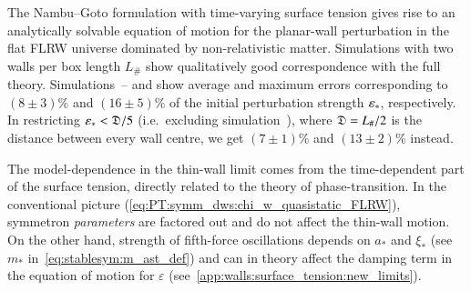 

\newcommand{\wallsep}{\ALIASwallsep}
\newcommand\hpA{\ALIAShpA}
\newcommand\hpB{\ALIAShpB}
\newcommand\hpC{\ALIAShpC}
\newcommand\hpAB{\ALIAShpAB}
\newcommand\hpCR{\ALIAShpCR}
\newcommand\hpCI{\ALIAShpCI}
\newcommand\epsA{\ALIASepsA}
\newcommand\epsB{\ALIASepsB}
\newcommand\epsC{\ALIASepsC}






    The Nambu--Goto formulation with time-varying surface tension gives rise to an analytically solvable equation of motion for the planar-wall perturbation in the flat FLRW universe dominated by non-relativistic matter. Simulations with two walls per box length $L_\#$ show qualitatively good correspondence with the full theory. Simulations~-- and  show average and maximum errors corresponding to $(8\pm 3)\%$ and $(16\pm 5)\%$ of the initial perturbation strength $\varepsilon_\ast$, respectively. In restricting $\epsast <\wallsep/5$ (i.e.~excluding simulation~), where $\wallsep=L_\#/2$ is the distance between every wall centre, we get $(7\pm 1)\%$ and $(13\pm 2)\%$ instead. 

    The model-dependence in the thin-wall limit comes from the time-dependent part of the surface tension, directly related to the theory of phase-transition. In the conventional picture (\cref{eq:PT:symm_dws:chi_w_quasistatic_FLRW}), symmetron \emph{parameters} are factored out and do not affect the thin-wall motion. On the other hand, strength of fifth-force oscillations depends on $a_\ast$ and $\xi_\ast$ (see $m_\ast$ in~\cref{eq:stablesym:m_ast_def}) and can in theory affect the damping term in the equation of motion for $\varepsilon$ (see~\cref{app:walls:surface_tension:new_limits}).



